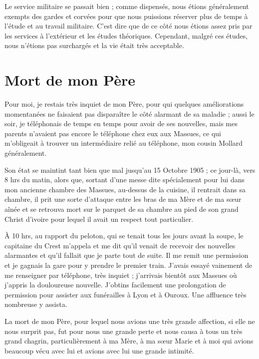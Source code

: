 \documentclass[11pt,a4paper]{report}
\begin{document}
Le service militaire se passait bien ; comme dispensés, nous étions généralement exempts des gardes et corvées pour que nous puissions réserver plus de temps à l'étude et au travail militaire. C'est dire que de ce côté nous étions assez pris par les services à l'extérieur et les études théoriques. Cependant, malgré ces études, nous n'étions pas surchargés et la vie était très acceptable.

\section*{Mort de mon Père}

Pour moi, je restais très inquiet de mon Père, pour qui quelques améliorations momentanées ne faisaient pas disparaître le côté alarmant de sa maladie ; aussi le soir, je téléphonais de temps en temps pour avoir de ses nouvelles, mais mes parents n'avaient pas encore le téléphone chez eux aux Massues, ce qui m'obligeait à trouver un intermédiaire relié au téléphone, mon cousin Mollard généralement.

Son état se maintint tant bien que mal jusqu'au 15 Octobre 1905 ; ce jour-là, vers 8 hrs du matin, alors que, sortant d'une messe dite spécialement pour lui dans mon ancienne chambre des Massues, au-dessus de la cuisine, il rentrait dans sa chambre, il prit une sorte d'attaque entre les bras de ma Mère et de ma sœur aînée et se retrouva mort sur le parquet de sa chambre au pied de son grand Christ d'ivoire pour lequel il avait un respect tout particulier.

À 10 hrs, au rapport du peloton, qui se tenait tous les jours avant la soupe, le capitaine du Crest m'appela et me dit qu'il venait de recevoir des nouvelles alarmantes et qu'il fallait que je parte tout de suite. Il me remit une permission et je gagnais la gare pour y prendre le premier train. J'avais essayé vainement de me renseigner par téléphone, très inquiet ; j'arrivais bientôt aux Massues où j'appris la douloureuse nouvelle. J'obtins facilement une prolongation de permission pour assister aux funérailles à Lyon et à Ouroux. Une affluence très nombreuse y assista.

La mort de mon Père, pour lequel nous avions une très grande affection, si elle ne nous surprit pas, fut pour nous une grande perte et nous causa à tous un très grand chagrin, particulièrement à ma Mère, à ma sœur Marie et à moi qui avions beaucoup vécu avec lui et avions avec lui une grande intimité.
\end{document}
